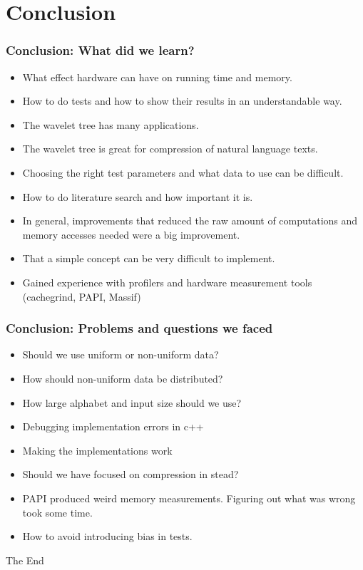 \documentclass{beamer}
\begin{document}
\section{Conclusion}
\begin{frame}
\frametitle{Conclusion: What did we learn?}
\begin{itemize}
\item What effect hardware can have on running time and memory.
\item How to do tests and how to show their results in an understandable way.
\item The wavelet tree has many applications.
\item The wavelet tree is great for compression of natural language texts.
\item Choosing the right test parameters and what data to use can be difficult.
\item How to do literature search and how important it is.
\item In general, improvements that reduced the raw amount of computations and memory accesses needed were a big improvement.
\item That a simple concept can be very difficult to implement.
\item Gained experience with profilers and hardware measurement tools (cachegrind, PAPI, Massif)
\end{itemize}
\end{frame}

\begin{frame}
\frametitle{Conclusion: Problems and questions we faced}
\begin{itemize}
\item Should we use uniform or non-uniform data?
\item How should non-uniform data be distributed?
\item How large alphabet and input size should we use?
\item Debugging implementation errors in c++
\item Making the implementations work
\item Should we have focused on compression in stead?
\item PAPI produced weird memory measurements. Figuring out what was wrong took some time.
\item How to avoid introducing bias in tests.
\end{itemize}
\end{frame}


\begin{frame}
\Huge{\centerline{The End}}
\end{frame}

\end{document}
